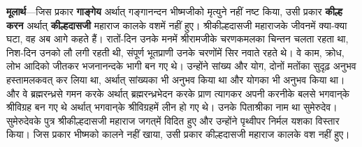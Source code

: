 \begin{sloppypar}\justifying{}
\textbf{मूलार्थ}—जिस प्रकार \textbf{गाङ्गेय} अर्थात् गङ्गानन्दन भीष्मजीको मृत्युने नहीं नष्ट किया, उसी प्रकार \textbf{कील्ह करन} अर्थात् \textbf{कील्हदासजी} महाराज कालके वशमें नहीं हुए। श्रीकील्हदासजी महाराजके जीवनमें क्या-क्या घटा, वह अब आगे कहते हैं। रातों-दिन उनके मनमें श्रीरामजीके चरणकमलका चिन्तन चलता रहता था, निश-दिन उनको लौ लगी रहती थी, संपूर्ण भूतप्राणी उनके चरणोंमें सिर नवाते रहते थे। वे काम, क्रोध, लोभ आदिको जीतकर भजनानन्दके भागी बन गए थे। उन्होंने सांख्य और योग, दोनों मतोंका सुदृढ़ अनुभव हस्तामलकवत् कर लिया था, अर्थात् सांख्यका भी अनुभव किया था और योगका भी अनुभव किया था। और वे ब्रह्मरन्ध्रसे गमन करके अर्थात् ब्रह्मरन्ध्र\-भेदन करके प्राण त्यागकर अपनी करनीके बलसे भगवान्‌के श्रीविग्रह बन गए थे अर्थात् भगवान्‌के श्रीविग्रहमें लीन हो गए थे। उनके पिताश्रीका नाम था सुमेरुदेव। सुमेरुदेवके पुत्र श्रीकील्हदासजी महाराज जगत्‌में विदित हुए और उन्होंने पृथ्वीपर निर्मल यशका विस्तार किया। जिस प्रकार भीष्मको कालने नहीं खाया, उसी प्रकार कील्हदासजी महाराज कालके वश नहीं हुए।
\end{sloppypar}



